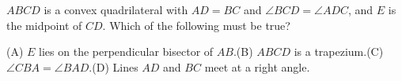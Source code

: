 $ABCD$ is a convex quadrilateral with $AD=BC$ and $\angle BCD=\angle ADC$, and $E$ is the midpoint of $CD$. Which of the following must be true?

(A) $E$ lies on the perpendicular bisector of $AB$.\quad(B) $ABCD$ is a trapezium.\quad(C) $\angle CBA=\angle BAD$.\quad(D) Lines $AD$ and $BC$ meet at a right angle.
